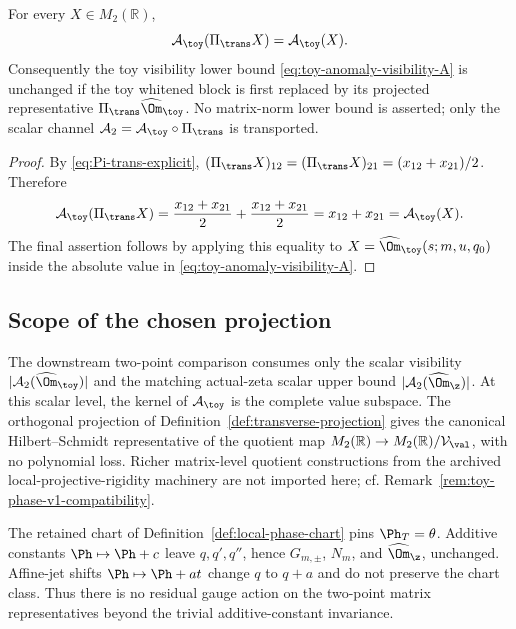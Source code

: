 \begin{lemma}
\label{lem:transverse-projection-A-toy-compatibility}
For every \(X\in M_2(\mathbb R)\),
\begin{equation}
\label{eq:A-toy-pi-compat}
        \mathcal A_\toy(\Pi_\trans X)=\mathcal A_\toy(X).
\end{equation}
Consequently the toy visibility lower bound
\eqref{eq:toy-anomaly-visibility-A} is unchanged if the toy whitened
block is first replaced by its projected representative
\(\Pi_\trans\widehat\Om_\toy\).  No matrix-norm lower bound is asserted;
only the scalar channel \(\mathcal A_2=\mathcal A_\toy\circ\Pi_\trans\)
is transported.
\end{lemma}

\begin{proof}
By \eqref{eq:Pi-trans-explicit},
\((\Pi_\trans X)_{12}=(\Pi_\trans X)_{21}=(x_{12}+x_{21})/2\).  Therefore
\[
\mathcal A_\toy(\Pi_\trans X)
=\frac{x_{12}+x_{21}}2+\frac{x_{12}+x_{21}}2
=x_{12}+x_{21}=\mathcal A_\toy(X).
\]
The final assertion follows by applying this equality to
\(X=\widehat\Om_\toy(s;m,u,q_0)\) inside the absolute value in
\eqref{eq:toy-anomaly-visibility-A}.
\end{proof}

\subsection{Scope of the chosen projection}
\label{subsec:transverse-projection-scope}

\begin{remark}
\label{rem:transverse-projection-no-richer-quotient}
The downstream two-point comparison consumes only the scalar visibility
\(|\mathcal A_2(\widehat\Om_\toy)|\) and the matching actual-zeta scalar
upper bound \(|\mathcal A_2(\widehat\Om_\z)|\).  At this scalar level,
the kernel of \(\mathcal A_\toy\) is the complete value subspace.  The
orthogonal projection of Definition~\ref{def:transverse-projection}
gives the canonical Hilbert--Schmidt representative of the quotient map
\(M_2(\mathbb R)\to M_2(\mathbb R)/\mathcal V_\val\), with no polynomial
loss.  Richer matrix-level quotient constructions from the archived
local-projective-rigidity machinery are not imported here; cf.
Remark~\ref{rem:toy-phase-v1-compatibility}.
\end{remark}

\begin{remark}
\label{rem:transverse-projection-residual-gauge}
The retained chart of Definition~\ref{def:local-phase-chart} pins
\(\Ph_T=\theta\).  Additive constants \(\Ph\mapsto\Ph+c\) leave
\(q,q',q''\), hence \(G_{m,\pm}\), \(N_m\), and \(\widehat\Om_\z\),
unchanged.  Affine-jet shifts \(\Ph\mapsto\Ph+at\) change \(q\) to
\(q+a\) and do not preserve the chart class.  Thus there is no residual
gauge action on the two-point matrix representatives beyond the trivial
additive-constant invariance.
\end{remark}

